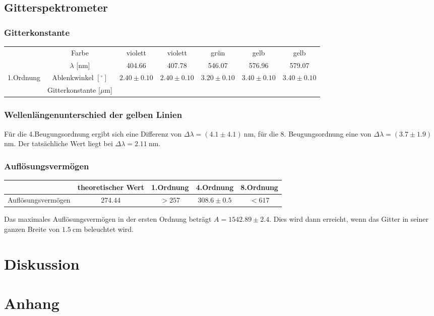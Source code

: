 \documentclass[12pt,a4paper,titlepage,headinclude,bibtotoc]{scrartcl}
\begin{document}
\subsection{Gitterspektrometer}
\subsubsection{Gitterkonstante}

\begin{table}[!htb]
	\centering	
	\begin{tabular}{|c|c|c|c|c|c|c|}
		\hline
		&Farbe & violett & violett & grün & gelb & gelb \\
		& $\lambda$ [nm]& 404.66 & 407.78 & 546.07 & 576.96 & 579.07\\
		\hline
		\multirow{2}{c}{1.Ordnung} & Ablenkwinkel $[^\circ]$ & $2.40 \pm 0.10$ & $2.40 \pm 0.10$ & $3.20 \pm 0.10$ & $3.40 \pm 0.10$ & $3.40 \pm 0.10$ \\ 
		& Gitterkonstante [$\mu$m] 
	\end{tabular}
\end{table}

\subsubsection{Wellenlängenunterschied der gelben Linien}

Für die 4.Beugungsordnung ergibt sich eine Differenz von $\Delta\lambda=(4.1 \pm 4.1)~$nm, für die 8. Beugungsordnung eine von $\Delta\lambda=(3.7 \pm 1.9)~$nm.
Der tatsächliche Wert liegt bei  $\Delta\lambda=2.11~$nm.


\subsubsection{Auflösungsvermögen}
\begin{table}[!htb]
	\centering
	\begin{tabular}{|c|c|c|c|c|}
		\hline		
		& theoretischer Wert &1.Ordnung &  4.Ordnung & 8.Ordnung \\
		\hline
	    Auflösungsvermögen & $274.44$ & $>257$ & $308.6 \pm 0.5$ & $<617$ \\
		\hline
	\end{tabular}
\end{table}
Das maximales Auflösungsvermögen in der ersten Ordnung beträgt $A=1542.89 \pm 2.4$.
Dies wird dann erreicht, wenn das Gitter in seiner ganzen Breite von $1.5~$cm beleuchtet wird.

\section{Diskussion}
\label{sec:diskussion}

\section{Anhang}



\end{document}
